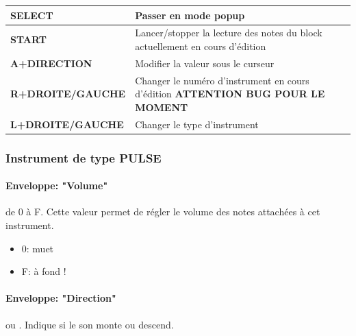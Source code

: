 \documentclass[12pt,a4paper]{article}
\begin{document}
        \tablelasttail{\hline}
        \begin{supertabular}{|l|p{11cm}|}
        \hline
            {\bf SELECT} & Passer en mode popup \\
            \hline
            {\bf START} & Lancer/stopper la lecture des notes du block actuellement en cours d'édition \\
            \hline
            {\bf A+DIRECTION} & Modifier la valeur sous le curseur \\
            \hline
            {\bf R+DROITE/GAUCHE} & Changer le numéro d'instrument en cours d'édition {\bf ATTENTION BUG POUR LE MOMENT} \\
            \hline
            {\bf L+DROITE/GAUCHE} & Changer le type d'instrument \\
        \hline
        \end{supertabular}
    
        \subsubsection{Instrument de type PULSE}
        
        
            \paragraph{Enveloppe: "Volume"} de 0 à F. Cette valeur permet de régler le volume des notes attachées à cet instrument. 
            \begin{itemize}
                \item{0: muet}
                \item{F: à fond !}
            \end{itemize}
            
            \paragraph{Enveloppe: "Direction"}  ou .
            Indique si le son monte ou descend.
            
\end{document}
